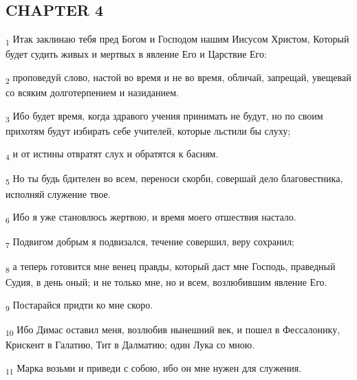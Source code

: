 \subsection{CHAPTER 4}
\begin{tcolorbox}
\textsubscript{1} Итак заклинаю тебя пред Богом и Господом нашим Иисусом Христом, Который будет судить живых и мертвых в явление Его и Царствие Его:
\end{tcolorbox}
\begin{tcolorbox}
\textsubscript{2} проповедуй слово, настой во время и не во время, обличай, запрещай, увещевай со всяким долготерпением и назиданием.
\end{tcolorbox}
\begin{tcolorbox}
\textsubscript{3} Ибо будет время, когда здравого учения принимать не будут, но по своим прихотям будут избирать себе учителей, которые льстили бы слуху;
\end{tcolorbox}
\begin{tcolorbox}
\textsubscript{4} и от истины отвратят слух и обратятся к басням.
\end{tcolorbox}
\begin{tcolorbox}
\textsubscript{5} Но ты будь бдителен во всем, переноси скорби, совершай дело благовестника, исполняй служение твое.
\end{tcolorbox}
\begin{tcolorbox}
\textsubscript{6} Ибо я уже становлюсь жертвою, и время моего отшествия настало.
\end{tcolorbox}
\begin{tcolorbox}
\textsubscript{7} Подвигом добрым я подвизался, течение совершил, веру сохранил;
\end{tcolorbox}
\begin{tcolorbox}
\textsubscript{8} а теперь готовится мне венец правды, который даст мне Господь, праведный Судия, в день оный; и не только мне, но и всем, возлюбившим явление Его.
\end{tcolorbox}
\begin{tcolorbox}
\textsubscript{9} Постарайся придти ко мне скоро.
\end{tcolorbox}
\begin{tcolorbox}
\textsubscript{10} Ибо Димас оставил меня, возлюбив нынешний век, и пошел в Фессалонику, Крискент в Галатию, Тит в Далматию; один Лука со мною.
\end{tcolorbox}
\begin{tcolorbox}
\textsubscript{11} Марка возьми и приведи с собою, ибо он мне нужен для служения.
\end{tcolorbox}

